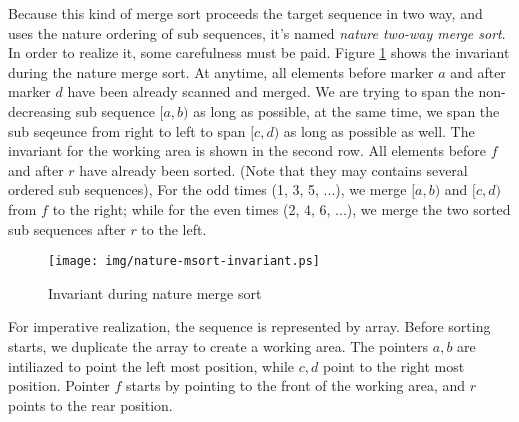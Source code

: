 \documentclass{article}
\begin{document}
Because this kind of merge sort proceeds the target sequence in two way, and uses the 
nature ordering of sub sequences, it's named {\em nature two-way merge sort}. In order
to realize it, some carefulness must be paid. Figure \ref{fig:nature-msort-invariant}
shows the invariant during the nature merge sort. At anytime, all elements before marker
$a$ and after marker $d$ have been already scanned and merged. We are trying to 
span the non-decreasing sub sequence $[a, b)$ as long as possible, at the same time,
we span the sub seqeunce from right to left to span $[c, d)$ as long as possible as well.
The invariant for the working area is shown in the second row. All elements before
$f$ and after $r$ have already been sorted. (Note that they may contains several
ordered sub sequences), For the odd times (1, 3, 5, ...), we merge $[a, b)$ and $[c, d)$
from $f$ to the right; while for the even times (2, 4, 6, ...), we merge the two 
sorted sub sequences after $r$ to the left.

\begin{figure}[htbp]
 \centering
 \texttt{[image: img/nature-msort-invariant.ps]}
 \caption{Invariant during nature merge sort}
 \label{fig:nature-msort-invariant}
\end{figure}

For imperative realization, the sequence is represented by array. Before sorting starts, 
we duplicate the array to create a working area. The pointers $a, b$ are intiliazed to
point the left most position, while $c, d$ point to the right most position. Pointer $f$
starts by pointing to the front of the working area, and $r$ points to the rear
position.
\end{document}
